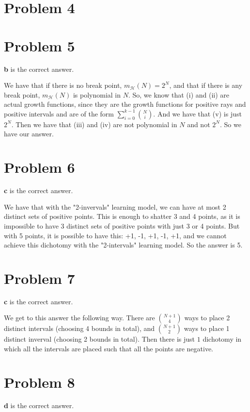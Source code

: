 \documentclass{article}
\begin{document}
\section*{Problem 4}

\section*{Problem 5}
\textbf{b} is the correct answer.

\noindent We have that if there is no break point, $m_{\mathcal{H}}(N) = 2^N$,
and that if there is any break point, $m_{\mathcal{H}}(N)$ is polynomial in $N$.
So, we know that (i) and (ii) are actual growth functions, since they are
the growth functions for positive rays and positive intervals and are of the
form $\sum_{i=0}^{k-1}\binom{N}{i}$. And we have that (v) is just $2^N$. Then
we have that (iii) and (iv) are not polynomial in $N$ and not $2^N$. So we have
our answer.
\section*{Problem 6}
\textbf{c} is the correct answer.

\noindent We have that with the "2-invervals" learning model, we can have at
most 2 distinct sets of positive points. This is enough to shatter 3 and 4 points,
as it is impossible to have 3 distinct sets of positive points with just
3 or 4 points. But with 5 points, it is possible to have this: +1, -1, +1, -1,
+1, and we cannot achieve this dichotomy with the "2-intervals" learning
model. So the answer is 5.
\section*{Problem 7}
\textbf{c} is the correct answer.

\noindent We get to this answer the following way. There are $\binom{N+1}{4}$
ways to place 2 distinct intervals (choosing 4 bounds in total),
and $\binom{N+1}{2}$ ways to place 1 distinct inverval (choosing 2 bounds in
total). Then there is just $1$ dichotomy in which all the intervals are placed
such that all the points are negative.
\section*{Problem 8}
\textbf{d} is the correct answer.
\end{document}
